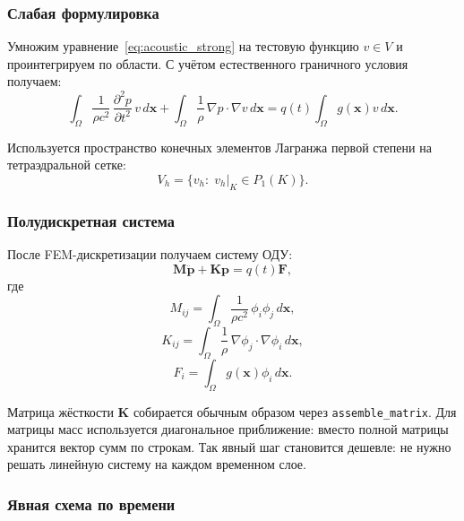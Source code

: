 \subsubsection{Слабая формулировка}

Умножим уравнение~\eqref{eq:acoustic_strong} на тестовую функцию
$v \in V$ и проинтегрируем по области. С учётом естественного
граничного условия получаем:
\begin{equation}\label{eq:acoustic_weak}
  \int_\Omega
  \frac{1}{\rho c^2}\,
  \frac{\partial^2 p}{\partial t^2}\,v\,d\mathbf{x}
  +
  \int_\Omega
  \frac{1}{\rho}\,\nabla p\cdot\nabla v\,d\mathbf{x}
  =
  q(t)\int_\Omega g(\mathbf{x})v\,d\mathbf{x}.
\end{equation}

Используется пространство конечных элементов Лагранжа первой степени
на тетраэдральной сетке:
\[
  V_h = \{v_h:\; v_h|_K \in P_1(K)\}.
\]


\subsubsection{Полудискретная система}

После FEM-дискретизации получаем систему ОДУ:
\begin{equation}\label{eq:semi_discrete}
  \mathbf{M}\ddot{\mathbf{p}} + \mathbf{K}\mathbf{p}
  = q(t)\mathbf{F},
\end{equation}
где
\begin{equation}
  M_{ij} = \int_\Omega
  \frac{1}{\rho c^2}\,\phi_i\phi_j\,d\mathbf{x},
\end{equation}
\begin{equation}
  K_{ij} = \int_\Omega
  \frac{1}{\rho}\,\nabla\phi_j\cdot\nabla\phi_i\,d\mathbf{x},
\end{equation}
\begin{equation}
  F_i = \int_\Omega g(\mathbf{x})\phi_i\,d\mathbf{x}.
\end{equation}

Матрица жёсткости $\mathbf{K}$ собирается обычным образом через
\texttt{assemble\_matrix}. Для матрицы масс используется диагональное
приближение: вместо полной матрицы хранится вектор сумм по строкам.
Так явный шаг становится дешевле: не нужно решать линейную систему на
каждом временном слое.

\subsubsection{Явная схема по времени}


